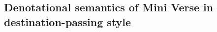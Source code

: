 %
%

\subsection{Denotational semantics of Mini Verse in destination-passing style}


\newcommand{\M}[1]{\ensuremath{#1}\xspace}
\newcommand{\SP}{\hspace{.5mm}}
\newcommand{\SPP}{\hspace{1mm}}
\newcommand{\E}[2]{\M{\mathcal{E}\llbracket\SP #1 \SP\rrbracket\SP #2}}
\renewcommand{\ss}{\M{ss}}
\renewcommand{\S}{\M{S}}
\renewcommand{\Sp}{\M{S\P}}
\newcommand{\U}{\M{\SPP\hat{\bigcup}\SPP}}
\newcommand{\e}{\M{e}}
\newcommand{\ep}{\M{\e\P}}
\newcommand{\op}{\M{\mathit{op}}}
\newcommand{\opp}{\M{\op\P}}
\newcommand{\oppp}{\M{\op\PP}}
\newcommand{\x}{\M{x}}
\newcommand{\xp}{\M{\x\P}}
\newcommand{\y}{\M{y}}
\newcommand{\yp}{\M{\y\P}} 
\newcommand{\z}{\M{z}}
\renewcommand{\k}{\M{k}}
\newcommand{\kp}{\M{\k\P}}
\newcommand{\rhop}{\M{\rho\P}}
\newcommand{\Val}{\M{W}}
\newcommand{\seq}[1]{\M{ [\SP #1 \SP] }}
\newcommand{\parfun}[2]{\M{#1 \rightharpoonup #2}}
\newcommand{\totfun}[2]{\M{#1 \rightarrow #2}}
\newcommand{\Z}{\M{\mathbb Z}}
\newcommand{\Ident}{\M{\mathit{Iden}}}
\newcommand{\X}{\M{X}}
\newcommand{\Xp}{\M{X\P}}
\newcommand{\Envs}[1]{\M{\text{Envs}(#1)}}
\newcommand{\pair}[2]{\M{#1 \times #2}}
\newcommand{\Noop}{\M{\emptyset}}
\newcommand{\Set}[1]{\M{\text{Set}(#1)}}
\newcommand{\exi}[1]{\M{\exists\,#1}}
\newcommand{\set}[1]{\M{\{\SP #1 \SP \}}}
\newcommand{\setcomp}[2]{\M{\set{\SP #1 \,\,|\,\,  #2 }}}
\newcommand{\seqcomp}[2]{\M{\seq{\SP #1 \,\,|\,\,  #2 }}}
\newcommand{\F}[2]{\M{ \mathcal{F} \llbracket\SP #1 \SP\rrbracket\SP #2 }}
\newcommand{\lam}[5]{\M{ \lambda_{#1} (#2) \{ #3 \} \{ #4 \}(#5) }}
\newcommand{\Lam}{\M{\mathit{lam}}}
\newcommand{\f}{\M{\mathit{f}}}
\newcommand{\fs}{\M{\mathit{fs}}}
\newcommand{\pick}[2]{\M{ #1 \leftarrow\! #2}}
\newcommand{\Fun}{\M{\mathit{Fun}}}
\newcommand{\s}{\M{s}}
\renewcommand{\sp}{\M{s\P}}
\newcommand{\spp}{\M{s\PP}}
\newcommand{\fail}{\M{\mathbf{fail}}}
\newcommand{\scope}[1]{\M{ \{ #1 \} }}
\newcommand{\Y}{\M{Y}}
\newcommand{\Exis}[1]{\M{\text{Exis}(#1)}}
\newcommand{\where}[1]{\M{\mathbf{where}\SPP\SP #1}}
\renewcommand{\Ws}{\M{W_{*}}}
\newcommand{\concat}[2]{\M{ #1 +\!\!+\, #2}}
\renewcommand{\P}{\M{^{\scalebox{0.8}{$\scriptstyle\prime$}}}}
\newcommand{\PP}{\M{^{\scalebox{0.8}{$\scriptstyle\prime\prime$}}}}
